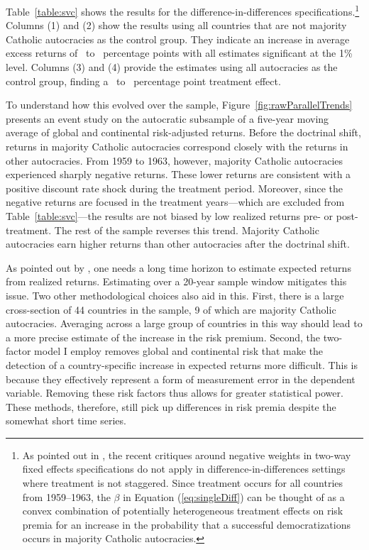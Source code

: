 Table~\ref{table:svc} shows the results for the difference-in-differences specifications.\footnote{As pointed out in \cite*{GoldsmithPinkham2022}, the recent critiques around negative weights in two-way fixed effects specifications do not apply in difference-in-differences settings where treatment is not staggered. Since treatment occurs for all countries from 1959--1963, the $\beta$ in Equation (\ref{eq:singleDiff}) can be thought of as a convex combination of potentially heterogeneous treatment effects on risk premia for an increase in the probability that a successful democratizations occurs in majority Catholic autocracies.} Columns (1) and (2) show the results using all countries that are not majority Catholic autocracies as the control group. They indicate an increase in average excess returns of \tabSevencolTwoPE\ to \tabSevencolOnePE\ percentage points with all estimates significant at the 1\% level.  Columns (3) and (4) provide the estimates using all autocracies as the control group, finding a \tabSevencolFourPE\ to \tabSevencolThreePE\ percentage point treatment effect.



To understand how this evolved over the sample, Figure~\ref{fig:rawParallelTrends} presents an event study on the autocratic subsample of a five-year moving average of global and continental risk-adjusted returns.  Before the doctrinal shift, returns in majority Catholic autocracies correspond closely with the returns in other autocracies. From 1959 to 1963, however, majority Catholic autocracies experienced sharply negative returns. These lower returns are consistent with a positive discount rate shock during the treatment period. Moreover, since the negative returns are focused in the treatment years---which are excluded from Table~\ref{table:svc}---the results are not biased by low realized returns pre- or post-treatment. The rest of the sample reverses this trend. Majority Catholic autocracies earn higher returns than other autocracies after the doctrinal shift.

As pointed out by \cite{Merton1980}, one needs a long time horizon to estimate expected returns from realized returns.  Estimating over a 20-year sample window mitigates this issue. Two other methodological choices also aid in this. First, there is a large cross-section of 44 countries in the sample, 9 of which are majority Catholic autocracies. Averaging across a large group of countries in this way should lead to a more precise estimate of the increase in the risk premium. Second, the two-factor model I employ removes global and continental risk that make the detection of a country-specific increase in expected returns more difficult. This is because they effectively represent a form of measurement error in the dependent variable. Removing these risk factors thus allows for greater statistical power. These methods, therefore, still pick up differences in risk premia despite the somewhat short time series.

